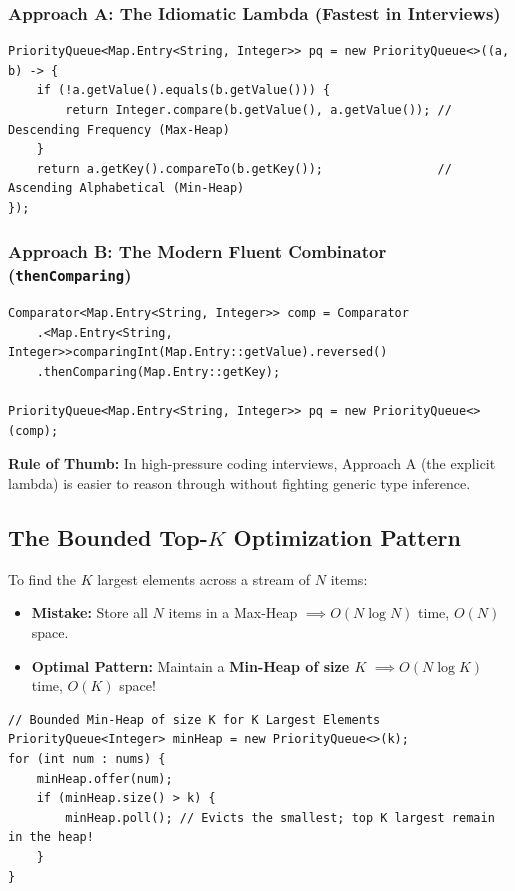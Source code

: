 \documentclass[10pt,journal,compsoc,onecolumn]{IEEEtran}
\begin{document}
\subsubsection{Approach A: The Idiomatic Lambda (Fastest in Interviews)}
\begin{verbatim}
PriorityQueue<Map.Entry<String, Integer>> pq = new PriorityQueue<>((a, b) -> {
    if (!a.getValue().equals(b.getValue())) {
        return Integer.compare(b.getValue(), a.getValue()); // Descending Frequency (Max-Heap)
    }
    return a.getKey().compareTo(b.getKey());                // Ascending Alphabetical (Min-Heap)
});
\end{verbatim}

\subsubsection{Approach B: The Modern Fluent Combinator (\texttt{thenComparing})}
\begin{verbatim}
Comparator<Map.Entry<String, Integer>> comp = Comparator
    .<Map.Entry<String, Integer>>comparingInt(Map.Entry::getValue).reversed()
    .thenComparing(Map.Entry::getKey);

PriorityQueue<Map.Entry<String, Integer>> pq = new PriorityQueue<>(comp);
\end{verbatim}
\textbf{Rule of Thumb:} In high-pressure coding interviews, Approach A (the explicit lambda) is easier to reason through without fighting generic type inference.

\subsection{The Bounded Top-$K$ Optimization Pattern}
To find the $K$ largest elements across a stream of $N$ items:
\begin{itemize}
    \item \textbf{Mistake:} Store all $N$ items in a Max-Heap $\implies O(N \log N)$ time, $O(N)$ space.
    \item \textbf{Optimal Pattern:} Maintain a \textbf{Min-Heap of size $K$} $\implies O(N \log K)$ time, $O(K)$ space!
\end{itemize}

\begin{verbatim}
// Bounded Min-Heap of size K for K Largest Elements
PriorityQueue<Integer> minHeap = new PriorityQueue<>(k);
for (int num : nums) {
    minHeap.offer(num);
    if (minHeap.size() > k) {
        minHeap.poll(); // Evicts the smallest; top K largest remain in the heap!
    }
}
\end{verbatim}
\end{document}
